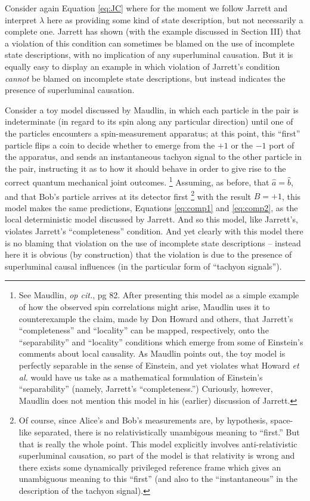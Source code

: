 \documentclass[aps,prc,twocolumn]{revtex4}
\begin{document}
Consider again Equation \ref{eq:JC}
where for the moment we follow Jarrett and interpret $\lambda$ here as
providing some kind of state description, but not necessarily a
complete one.  Jarrett has shown (with the example discussed
in Section III) that a violation of this condition can sometimes be blamed
on the use of incomplete state descriptions, with no implication of
any superluminal causation.  But it is equally easy to display an
example in which violation of Jarrett's condition \emph{cannot} be 
blamed on incomplete state descriptions, but instead indicates the
presence of superluminal causation.

Consider a toy model discussed by Maudlin, in which each particle in the
pair is indeterminate (in regard to its spin along any particular
direction) until one of the particles encounters a spin-measurement
apparatus; at this point, this ``first'' particle flips a coin to
decide whether to emerge from the $+1$ or the $-1$ port of the
apparatus, and sends an instantaneous tachyon signal to the other
particle in the pair, instructing it as to how it should behave in
order to give rise to the correct quantum mechanical joint outcomes.
\footnote{See Maudlin, \emph{op cit.}, pg 82.  After presenting this model as
  a simple example of how the observed spin correlations might
  arise, Maudlin uses it to counterexample the claim, made by Don
  Howard and others, that Jarrett's ``completeness'' and ``locality''
  can be mapped, respectively, onto the ``separability'' and
  ``locality'' conditions which emerge from some of Einstein's
  comments about local causality.  As Maudlin points out, the toy
  model is perfectly separable in the sense of Einstein, and yet
  violates what Howard \emph{et al.} would have us take as a mathematical
  formulation of Einstein's ``separability'' (namely, Jarrett's
  ``completeness.'')  Curiously, however, Maudlin does not
  mention this model in his (earlier) discussion of Jarrett.}
Assuming, as before, that $\hat{a} = \hat{b}$, and that Bob's particle
arrives at its detector first
\footnote{Of course, since Alice's and Bob's measurements are, by
  hypothesis, space-like separated, there is no relativistically
  unambigous meaning to ``first.''  But that is really the whole
  point.  This model explicitly involves anti-relativistic
  superluminal causation, so part of the model is that relativity is
  wrong and there exists some dynamically privileged reference frame
  which gives an unambiguous meaning to this ``first'' (and also to
  the ``instantaneous'' in the description of the tachyon signal).}
with the result $B = +1$, 
this model makes the same predictions, Equations \ref{eq:comp1} and
\ref{eq:comp2}, as the local deterministic model discussed by
Jarrett.  And so this model, like Jarrett's, violates Jarrett's
``completeness'' condition.  And yet clearly with this model there is
no blaming that violation on the use of incomplete state descriptions
-- instead here it is obvious (by construction) that the violation is
due to the presence of superluminal causal influences (in the
particular form of ``tachyon signals'').    
\end{document}
